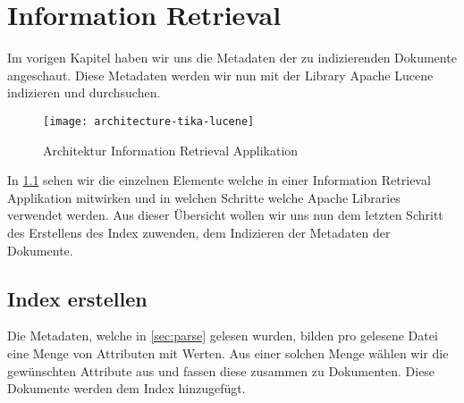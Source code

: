 \begin{comment}
Aufsetzen der Suche
\begin{itemize}
    \item Indizieren von ein bis zwei der untersuchten Medienformaten.
    \item Suchabfragen erstellen.
\end{itemize}

\paragraph{Result} \hfill \\
\begin{itemize}
    \item Ein lauffähige Instanz von Lucene.
    \item Vorbereitung der Dokumente (Mediadateinen) um die Metadaten zu extrahieren.
\end{itemize}
\end{comment}


\chapter{Information Retrieval}
\label{ch:setup}

Im vorigen Kapitel haben wir uns die Metadaten der
zu indizierenden Dokumente angeschaut. Diese Metadaten
werden wir nun mit der Library Apache Lucene \cite{web:lucene}
indizieren und durchsuchen.

\begin{figure}[ht]
    \centering
    \texttt{[image: architecture-tika-lucene]}
    \caption{Architektur Information Retrieval Applikation}
    \label{fig:tika-lucene}
\end{figure}

In \cref{fig:tika-lucene} sehen wir die einzelnen Elemente
welche in einer Information Retrieval Applikation mitwirken
und in welchen Schritte welche Apache Libraries verwendet
werden.
Aus dieser Übersicht wollen wir uns nun dem letzten Schritt des Erstellens
des Index zuwenden, dem Indizieren der Metadaten der Dokumente.
\cite{web:tika-lucene}

\section{Index erstellen}
\label{sec:createindex}
Die Metadaten, welche in \cref{sec:parse} gelesen
wurden, bilden pro gelesene Datei eine Menge von
Attributen mit Werten. Aus einer solchen Menge
wählen wir die gewünschten Attribute aus und 
fassen diese zusammen zu Dokumenten. Diese Dokumente
werden dem Index hinzugefügt.


